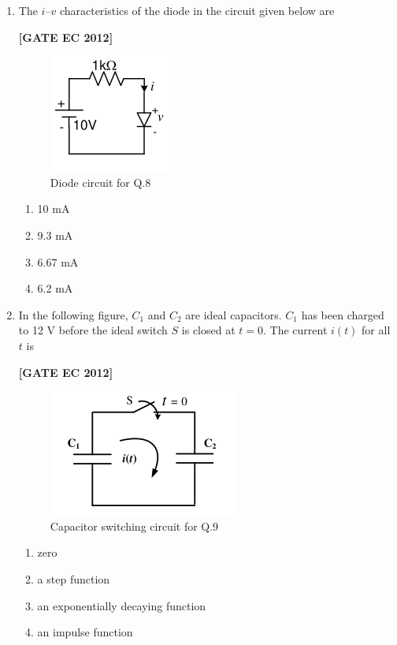 \documentclass[12pt]{article}
\begin{document}
\begin{enumerate}[leftmargin=1.0em, label=\textbf{Q.\arabic*.}, itemsep=2em]
\item The $i$–$v$ characteristics of the diode in the circuit given below are

\noindent \textbf{[GATE EC 2012]}
\begin{figure}[H]\centering
\includegraphics[width=0.5\columnwidth]{figs/q8.png}
\caption{Diode circuit for Q.8}
\label{fig:q8}
\end{figure}
\begin{multicols}{2}
    \begin{enumerate}
        \item 10 mA
        \item 9.3 mA
        \item 6.67 mA
        \item 6.2 mA
    \end{enumerate}
\end{multicols}

\item In the following figure, $C_1$ and $C_2$ are ideal capacitors. $C_1$ has been charged to 12 V before the ideal switch $S$ is closed at $t=0$. The current $i(t)$ for all $t$ is

\noindent \textbf{[GATE EC 2012]}
\begin{figure}[H]\centering
\includegraphics[width=0.5\columnwidth]{figs/q9.png}
\caption{Capacitor switching circuit for Q.9}
\label{fig:q9}
\end{figure}
\begin{multicols}{2}
    \begin{enumerate}
        \item zero
        \item a step function
        \item an exponentially decaying function
        \item an impulse function
    \end{enumerate}
\end{multicols}


\end{enumerate}
\end{document}
